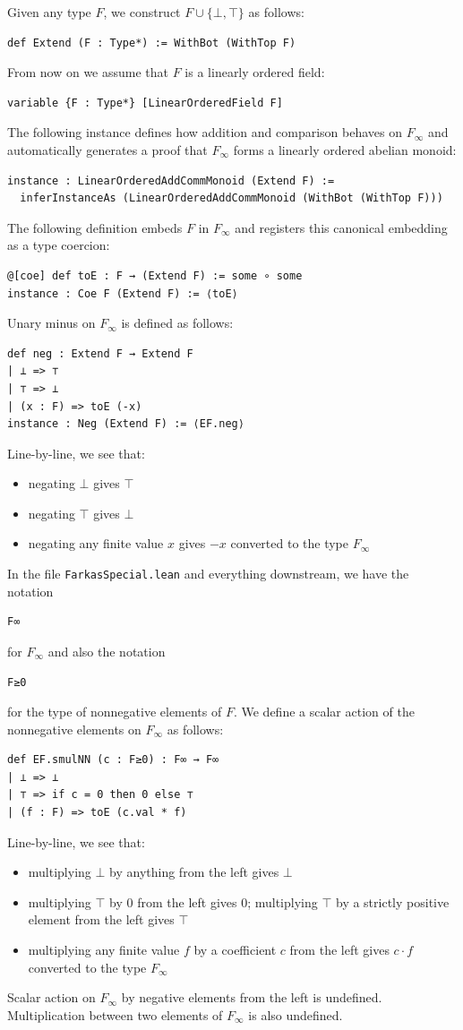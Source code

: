 \documentclass[]{article}
\renewcommand{\.}{\hskip .75pt}
\let\*=\cdot
\begin{document}
Given any type $F$, we construct $F \cup \{ \bot, \top \}$ as follows:
\begin{lstlisting}
def Extend (F : Type*) := WithBot (WithTop F)
\end{lstlisting}
From now on we assume that $F$ is a linearly ordered field:
\begin{lstlisting}
variable {F : Type*} [LinearOrderedField F]
\end{lstlisting}
The following instance defines how addition and comparison
behaves on $F_\infty$ and automatically generates a proof
that $F_\infty$ forms a linearly ordered abelian monoid:
\begin{lstlisting}
instance : LinearOrderedAddCommMonoid (Extend F) :=
  inferInstanceAs (LinearOrderedAddCommMonoid (WithBot (WithTop F)))
\end{lstlisting} \pagebreak[2]
The following definition embeds $F$ in $F_\infty$ and registers
this canonical embedding as a type coercion:
\begin{lstlisting}
@[coe] def toE : F → (Extend F) := some ∘ some
instance : Coe F (Extend F) := ⟨toE⟩
\end{lstlisting}
Unary minus on $F_\infty$ is defined as follows:
\begin{lstlisting}
def neg : Extend F → Extend F
| ⊥ => ⊤
| ⊤ => ⊥
| (x : F) => toE (-x)
instance : Neg (Extend F) := ⟨EF.neg⟩
\end{lstlisting}
Line-by-line, we see that:
\begin{itemize}
\item negating $\bot$ gives $\top$
\item negating $\top$ gives $\bot$
\item negating any finite value $x$ gives $-x$ converted to the type $F_\infty$
\end{itemize}
In the file \texttt{FarkasSpecial.lean} and everything downstream,
we have the notation
\begin{lstlisting}
F∞
\end{lstlisting}
for $F_\infty$ and also the notation
\begin{lstlisting}
F≥0
\end{lstlisting}
for the type of nonnegative elements of $F$.
We define a scalar action of the nonnegative elements
on $F_\infty$ as follows:
\begin{lstlisting}
def EF.smulNN (c : F≥0) : F∞ → F∞
| ⊥ => ⊥
| ⊤ => if c = 0 then 0 else ⊤
| (f : F) => toE (c.val * f)
\end{lstlisting}
Line-by-line, we see that:
\begin{itemize}
\item multiplying $\bot$ by anything from the left gives $\bot$
\item multiplying $\top$ by $0$ from the left gives $0$;
multiplying $\top$ by a strictly positive element from the left gives $\top$
\item multiplying any finite value $f$ by a coefficient $c$ from the left
gives $c \* f$ converted to the type $F_\infty$
\end{itemize}
Scalar action on $F_\infty$ by negative elements from the left is undefined.
Multiplication between two elements of $F_\infty$ is also undefined.
\end{document}
